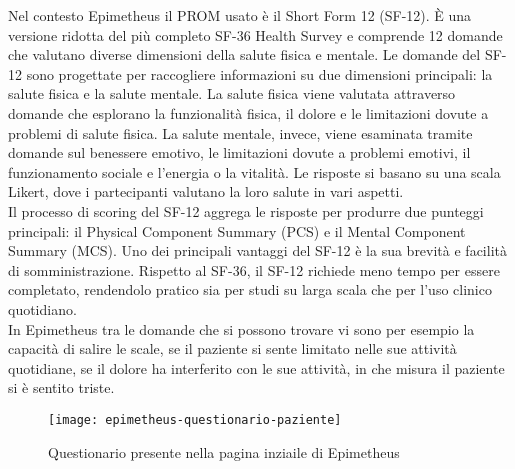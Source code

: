 Nel contesto Epimetheus il PROM usato è il Short Form 12 (SF-12). È una versione ridotta del più completo SF-36 Health Survey e comprende 12 domande che valutano diverse dimensioni della salute fisica e mentale.
Le domande del SF-12 sono progettate per raccogliere informazioni su due dimensioni principali: la salute fisica e la salute mentale. La salute fisica viene valutata attraverso domande che esplorano la funzionalità fisica, il dolore e le limitazioni dovute a problemi di salute fisica. La salute mentale, invece, viene esaminata tramite domande sul benessere emotivo, le limitazioni dovute a problemi emotivi, il funzionamento sociale e l'energia o la vitalità. Le risposte si basano su una scala Likert, dove i partecipanti valutano la loro salute in vari aspetti.\\
Il processo di scoring del SF-12 aggrega le risposte per produrre due punteggi principali: il Physical Component Summary (PCS) e il Mental Component Summary (MCS). Uno dei principali vantaggi del SF-12 è la sua brevità e facilità di somministrazione. Rispetto al SF-36, il SF-12 richiede meno tempo per essere completato, rendendolo pratico sia per studi su larga scala che per l'uso clinico quotidiano. \\
In Epimetheus tra le domande che si possono trovare vi sono per esempio la capacità di salire le scale, se il paziente si sente limitato nelle sue attività quotidiane, se il dolore ha interferito con le sue attività, in che misura il paziente si è sentito triste. 

\begin{figure}[!ht] 
    \centering 
    \texttt{[image: epimetheus-questionario-paziente]} 
    \caption{Questionario presente nella pagina inziaile di Epimetheus}
\end{figure}